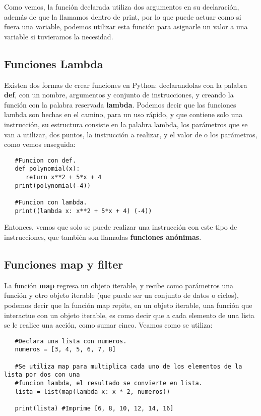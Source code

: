 Como vemos, la función declarada utiliza dos argumentos en su declaración, además de que la llamamos dentro de print, por lo que puede actuar como si fuera una variable, podemos utilizar esta función para asignarle un valor a una variable si tuvieramos la necesidad.


\subsection{Funciones Lambda}
\hspace{0.55cm}Existen dos formas de crear funciones en Python: declarandolas con la palabra \textbf{def}, con un nombre, argumentos y conjunto de instrucciones, y creando la función con la palabra reservada \textbf{lambda}. Podemos decir que las funciones lambda son hechas en el camino, para un uso rápido, y que contiene solo una instrucción, su estructura consiste en la palabra lambda, los parámetros que se van a utilizar, dos puntos, la instrucción a realizar, y el valor de o los parámetros, como vemos enseguida:
\begin{lstlisting}
   #Funcion con def.
   def polynomial(x):
      return x**2 + 5*x + 4
   print(polynomial(-4))

   #Funcion con lambda.
   print((lambda x: x**2 + 5*x + 4) (-4))
\end{lstlisting}

Entonces, vemos que solo se puede realizar una instrucción con este tipo de instrucciones, que también son llamadas \textbf{funciones anónimas}.


\subsection{Funciones map y filter}
\hspace{0.55cm}La función \textbf{map} regresa un objeto iterable, y recibe como parámetros una función y otro objeto iterable (que puede ser un conjunto de datos o ciclos), podemos decir que la función map repite, en un objeto iterable, una función que interactue con un objeto iterable, es como decir que a cada elemento de una lista se le realice una acción, como sumar cinco. Veamos como se utiliza:
\begin{lstlisting}
   #Declara una lista con numeros.
   numeros = [3, 4, 5, 6, 7, 8]
   
   #Se utiliza map para multiplica cada uno de los elementos de la lista por dos con una
   #funcion lambda, el resultado se convierte en lista.
   lista = list(map(lambda x: x * 2, numeros))
   
   print(lista) #Imprime [6, 8, 10, 12, 14, 16]
\end{lstlisting}

